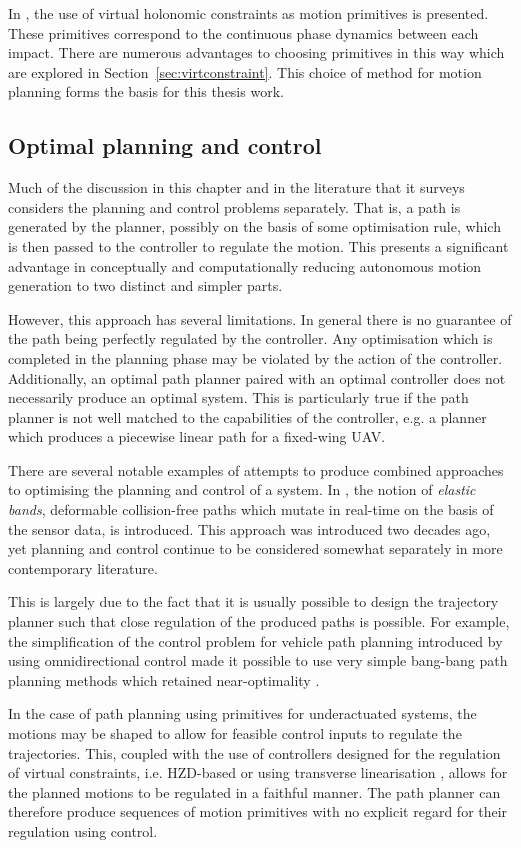 In \cite{manchester13planning}, the use of virtual holonomic constraints as motion primitives is presented. These primitives correspond to the continuous phase dynamics between each impact. There are numerous advantages to choosing primitives in this way which are explored in Section~\ref{sec:virtconstraint}. This choice of method for motion planning forms the basis for this thesis work.

\subsection{Optimal planning and control}
Much of the discussion in this chapter and in the literature that it surveys considers the planning and control problems separately. That is, a path is generated by the planner, possibly on the basis of some optimisation rule, which is then passed to the controller to regulate the motion. This presents a significant advantage in conceptually and computationally reducing autonomous motion generation to two distinct and simpler parts.

However, this approach has several limitations. In general there is no guarantee of the path being perfectly regulated by the controller. Any optimisation which is completed in the planning phase may be violated by the action of the controller. Additionally, an optimal path planner paired with an optimal controller does not necessarily produce an optimal system. This is particularly true if the path planner is not well matched to the capabilities of the controller, e.g. a planner which produces a piecewise linear path for a fixed-wing UAV.

There are several notable examples of attempts to produce combined approaches to optimising the planning and control of a system. In \cite{quinlan1993elastic}, the notion of \textit{elastic bands}, deformable collision-free paths which mutate in real-time on the basis of the sensor data, is introduced. This approach was introduced two decades ago, yet planning and control continue to be considered somewhat separately in more contemporary literature.

This is largely due to the fact that it is usually possible to design the trajectory planner such that close regulation of the produced paths is possible. For example, the simplification of the control problem for vehicle path planning introduced by using omnidirectional control made it possible to use very simple bang-bang path planning methods which retained near-optimality \cite{kalmar2004near}.

In the case of path planning using primitives for underactuated systems, the motions may be shaped to allow for feasible control inputs to regulate the trajectories. This, coupled with the use of controllers designed for the regulation of virtual constraints, i.e. HZD-based \cite{sreenath2011compliant} or using transverse linearisation \cite{manchester13planning}, allows for the planned motions to be regulated in a faithful manner. The path planner can therefore produce sequences of motion primitives with no explicit regard for their regulation using control.